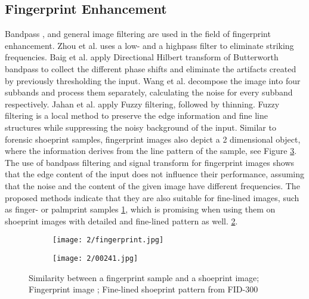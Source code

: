 \documentclass[draft,final]{vutinfth} %
\begin{document}
\subsection{Fingerprint Enhancement}
\par
Bandpass \cite{zhou2011adaptive}, \cite{baig2015enhancement} and general image filtering  \cite{jahan2017robust} are used in the field of fingerprint enhancement.
Zhou et al. \cite{zhou2011adaptive} uses a low- and a highpass filter to eliminate striking frequencies. 
Baig et al. \cite{baig2015enhancement} apply Directional Hilbert transform of Butterworth bandpass to collect the different phase shifts and eliminate the artifacts created by previously thresholding the input.
Wang et al. \cite{wang2014enhanced} decompose the image into four subbands and process them separately, calculating the noise for every subband respectively.
Jahan et al. \cite{jahan2017robust} apply Fuzzy filtering, followed by thinning.
Fuzzy filtering is a local method to preserve the edge information and fine line structures while suppressing the noisy background of the input.
Similar to forensic shoeprint samples, fingerprint images also depict a 2 dimensional object, where the information derives from the line pattern of the sample, see Figure \ref{fig:rw:fingerprint}.
The use of bandpass filtering and signal transform for fingerprint images shows that the edge content of the input does not influence their performance, assuming that the noise and the content of the given image have different frequencies.
The proposed methods indicate that they are also suitable for fine-lined images, such as finger- or palmprint samples \ref{fig:rw:fp}, which is promising when using them on shoeprint images with detailed and fine-lined pattern as well. \ref{fig:rw:ref}. 

\begin{figure}[h]
  \centering
  \begin{subfigure}[t]{0.4\columnwidth}
    \centering
    \texttt{[image: 2/fingerprint.jpg]}
    \subcaption{}
    \label{fig:rw:fp}
  \end{subfigure}
  \begin{subfigure}[t]{0.4\columnwidth}
    \centering
    \texttt{[image: 2/00241.jpg]}
    \subcaption{}
    \label{fig:rw:ref}
  \end{subfigure}
  \caption{Similarity between a fingerprint sample and a shoeprint  image;
		 Fingerprint image \cite{van2016fingerprint};  Fine-lined shoeprint pattern from FID-300  \cite{kortylewski2014unsupervised}}
  \label{fig:rw:fingerprint} %
\end{figure}
\end{document}
